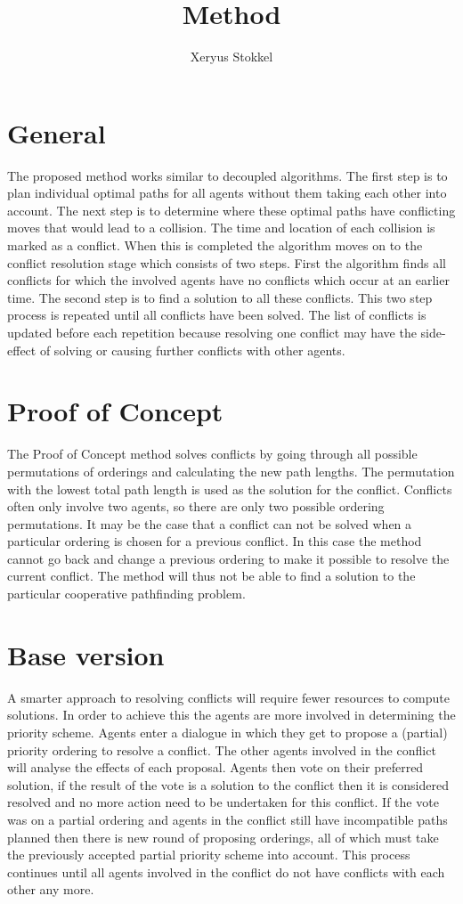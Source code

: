 \documentclass[a4paper]{article}
\title{Method}
\author{Xeryus Stokkel}
\date{}
\begin{document}
\maketitle

\section{General}
The proposed method works similar to decoupled algorithms. The first step is to 
plan individual optimal paths for all agents without them taking each other 
into account. The next step is to determine where these optimal paths have 
conflicting moves that would lead to a collision. The time and location of each 
collision is marked as a conflict. When this is completed the algorithm moves 
on to the conflict resolution stage which consists of two steps. First the 
algorithm finds all conflicts for which the involved agents have no conflicts 
which occur at an earlier time. The second step is to find a solution to all 
these conflicts. This two step process is repeated until all conflicts have 
been solved. The list of conflicts is updated before each repetition because 
resolving one conflict may have the side-effect of solving or causing further 
conflicts with other agents.

\section{Proof of Concept}
The Proof of Concept method solves conflicts by going through all possible 
permutations of orderings and calculating the new path lengths. The permutation 
with the lowest total path length is used as the solution for the conflict. 
Conflicts often only involve two agents, so there are only two possible 
ordering permutations. It may be the case that a conflict can not be solved 
when a particular ordering is chosen for a previous conflict. In this case the 
method cannot go back and change a previous ordering to make it possible to 
resolve the current conflict. The method will thus not be able to find a 
solution to the particular cooperative pathfinding problem.

\section{Base version}
A smarter approach to resolving conflicts will require fewer resources to 
compute solutions. In order to achieve this the agents are more involved in 
determining the priority scheme. Agents enter a dialogue in which they get to 
propose a (partial) priority 
ordering to resolve a conflict. The other agents involved in the conflict will 
analyse the effects of each proposal. Agents then vote on their preferred 
solution, if the result of the vote is a solution to the conflict then it is 
considered resolved and no more action need to be undertaken for this conflict. 
If the vote was on a partial ordering and agents in the conflict still have 
incompatible paths planned then there is  new round of proposing orderings, all 
of which must take the previously accepted partial priority scheme into 
account. This process continues until all agents involved in the conflict do 
not have conflicts with each other any more.
\end{document}
